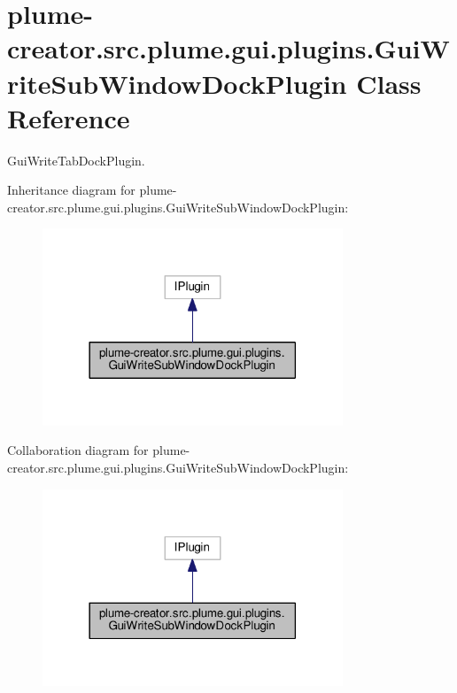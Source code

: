 \hypertarget{classplume-creator_1_1src_1_1plume_1_1gui_1_1plugins_1_1_gui_write_sub_window_dock_plugin}{}\section{plume-\/creator.src.\+plume.\+gui.\+plugins.\+Gui\+Write\+Sub\+Window\+Dock\+Plugin Class Reference}
\label{classplume-creator_1_1src_1_1plume_1_1gui_1_1plugins_1_1_gui_write_sub_window_dock_plugin}


Gui\+Write\+Tab\+Dock\+Plugin.  




Inheritance diagram for plume-\/creator.src.\+plume.\+gui.\+plugins.\+Gui\+Write\+Sub\+Window\+Dock\+Plugin\+:\nopagebreak
\begin{figure}[H]
\begin{center}
\leavevmode
\includegraphics[width=254pt]{classplume-creator_1_1src_1_1plume_1_1gui_1_1plugins_1_1_gui_write_sub_window_dock_plugin__inherit__graph}
\end{center}
\end{figure}


Collaboration diagram for plume-\/creator.src.\+plume.\+gui.\+plugins.\+Gui\+Write\+Sub\+Window\+Dock\+Plugin\+:\nopagebreak
\begin{figure}[H]
\begin{center}
\leavevmode
\includegraphics[width=254pt]{classplume-creator_1_1src_1_1plume_1_1gui_1_1plugins_1_1_gui_write_sub_window_dock_plugin__coll__graph}
\end{center}
\end{figure}
